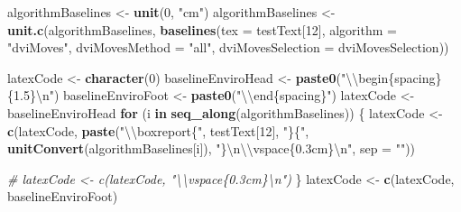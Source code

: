 \documentclass[]{article}
\newenvironment{Shaded}{\begin{snugshade}}{\end{snugshade}}
\newcommand{\KeywordTok}[1]{\textcolor[rgb]{0.13,0.29,0.53}{\textbf{#1}}}
\newcommand{\DataTypeTok}[1]{\textcolor[rgb]{0.13,0.29,0.53}{#1}}
\newcommand{\DecValTok}[1]{\textcolor[rgb]{0.00,0.00,0.81}{#1}}
\newcommand{\CharTok}[1]{\textcolor[rgb]{0.31,0.60,0.02}{#1}}
\newcommand{\StringTok}[1]{\textcolor[rgb]{0.31,0.60,0.02}{#1}}
\newcommand{\CommentTok}[1]{\textcolor[rgb]{0.56,0.35,0.01}{\textit{#1}}}
\newcommand{\ControlFlowTok}[1]{\textcolor[rgb]{0.13,0.29,0.53}{\textbf{#1}}}
\newcommand{\NormalTok}[1]{#1}
\begin{document}
\begin{Shaded}
\begin{Highlighting}[]
\NormalTok{algorithmBaselines <-}\StringTok{ }\KeywordTok{unit}\NormalTok{(}\DecValTok{0}\NormalTok{, }\StringTok{"cm"}\NormalTok{)}
\NormalTok{    algorithmBaselines <-}\StringTok{ }\KeywordTok{unit.c}\NormalTok{(algorithmBaselines, }
                                 \KeywordTok{baselines}\NormalTok{(}\DataTypeTok{tex =}\NormalTok{ testText[}\DecValTok{12}\NormalTok{],}
                                        \DataTypeTok{algorithm =} \StringTok{"dviMoves"}\NormalTok{,}
                                        \DataTypeTok{dviMovesMethod =} \StringTok{"all"}\NormalTok{,}
                                        \DataTypeTok{dviMovesSelection =}\NormalTok{ dviMovesSelection))}

\NormalTok{  latexCode <-}\StringTok{ }\KeywordTok{character}\NormalTok{(}\DecValTok{0}\NormalTok{)}
\NormalTok{  baselineEnviroHead <-}\StringTok{ }\KeywordTok{paste0}\NormalTok{(}\StringTok{"}\CharTok{\textbackslash{}\textbackslash{}}\StringTok{begin\{spacing\}\{1.5\}}\CharTok{\textbackslash{}n}\StringTok{"}\NormalTok{)}
\NormalTok{  baselineEnviroFoot <-}\StringTok{ }\KeywordTok{paste0}\NormalTok{(}\StringTok{"}\CharTok{\textbackslash{}\textbackslash{}}\StringTok{end\{spacing\}"}\NormalTok{)}
\NormalTok{  latexCode <-}\StringTok{ }\NormalTok{baselineEnviroHead}
  \ControlFlowTok{for}\NormalTok{ (i }\ControlFlowTok{in} \KeywordTok{seq_along}\NormalTok{(algorithmBaselines)) \{}
\NormalTok{    latexCode <-}\StringTok{ }\KeywordTok{c}\NormalTok{(latexCode, }
                   \KeywordTok{paste}\NormalTok{(}\StringTok{"}\CharTok{\textbackslash{}\textbackslash{}}\StringTok{boxreport\{"}\NormalTok{, }
\NormalTok{                         testText[}\DecValTok{12}\NormalTok{], }
                         \StringTok{"\}\{"}\NormalTok{, }
                         \KeywordTok{unitConvert}\NormalTok{(algorithmBaselines[i]), }
                         \StringTok{"\}}\CharTok{\textbackslash{}n\textbackslash{}\textbackslash{}}\StringTok{vspace\{0.3cm\}}\CharTok{\textbackslash{}n}\StringTok{"}\NormalTok{, }
                         \DataTypeTok{sep =} \StringTok{""}\NormalTok{))}
    
    \CommentTok{# latexCode <- c(latexCode, "\textbackslash{}\textbackslash{}vspace\{0.3cm\}\textbackslash{}n")}
\NormalTok{  \}}
\NormalTok{  latexCode <-}\StringTok{ }\KeywordTok{c}\NormalTok{(latexCode, baselineEnviroFoot)}
\end{Highlighting}
\end{Shaded}
\end{document}
